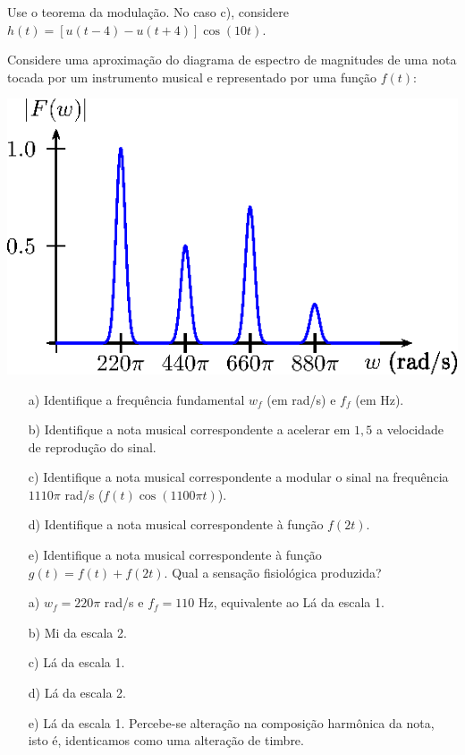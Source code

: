 \begin{resp}
 Use o teorema da modulação. No caso c), considere $h(t)=\left[u(t-4)-u(t+4)\right]\cos(10t)$.
\end{resp}
\begin{exer} Considere uma aproximação do diagrama de espectro de magnitudes de uma nota tocada por um instrumento musical e representado por uma função $f(t)$:
\begin{center}
\includegraphics{cap_propriedades_transformada/pics/figura_24}\end{center}
\begin{itemize}
 \item[a)] Identifique a frequência fundamental $w_f$ (em rad/s) e $f_f$ (em Hz).
 \item[b)] Identifique a nota musical correspondente a acelerar em $1,5$ a velocidade de reprodução do sinal.
 \item[c)] Identifique a nota musical correspondente a modular o sinal na frequência $1110\pi$ rad/s ($f(t)\cos(1100\pi t)$).
 \item[d)] Identifique a nota musical correspondente à função $f(2t)$.
 \item[e)] Identifique a nota musical correspondente à função $g(t)=f(t)+f(2t)$. Qual a sensação fisiológica produzida?
 \end{itemize}
\end{exer}
\begin{resp}
\begin{itemize}
 \item[a)] $w_f=220\pi$ rad/s e $f_f=110$ Hz, equivalente ao Lá da escala 1.
 \item[b)] Mi da escala 2.
 \item[c)] Lá da escala 1.
 \item[d)] Lá da escala 2.
 \item[e)] Lá da escala 1. Percebe-se alteração na composição harmônica da nota, isto é, identicamos como uma alteração de timbre.
 \end{itemize}
\end{resp}

